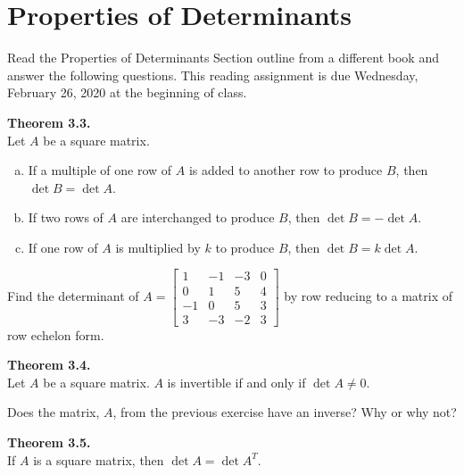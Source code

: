 \newpage

\section{Properties of Determinants}
\name

Read the Properties of Determinants Section outline from a different book and answer the following questions.  This reading assignment is due Wednesday, February 26, 2020 at the beginning of class.
\begin{boxthm}
	\textbf{Theorem 3.3.} \\
	Let $A$ be a square matrix.
	\begin{enumerate}[(a)]
		\item If a multiple of one row of $A$ is added to another row to produce $B$, then $\det B = \det A$.
		\item If two rows of $A$ are interchanged to produce $B$, then $\det B = -\det A$.
		\item If one row of $A$ is multiplied by $k$ to produce $B$, then $\det B = k\det A$.
	\end{enumerate}
\end{boxthm}

\begin{exercise} %
	Find the determinant of $A=\begin{bmatrix}1&-1&-3&0\\0&1&5&4\\-1&0&5&3\\3&-3&-2&3\end{bmatrix}$ by row reducing to a matrix of row echelon form.
\end{exercise}
\vfill

\begin{boxthm}
	\textbf{Theorem 3.4.} \\
	Let $A$ be a square matrix. $A$ is invertible if and only if $\det A \ne 0$.
\end{boxthm}

\begin{exercise}
Does the matrix, $A$, from the previous exercise have an inverse? Why or why not?
\end{exercise}

\vspace{2cm}

\newpage

\begin{boxthm}
	\textbf{Theorem 3.5.} \\
	If $A$ is a square matrix, then $\det A = \det A^T$.
\end{boxthm}

